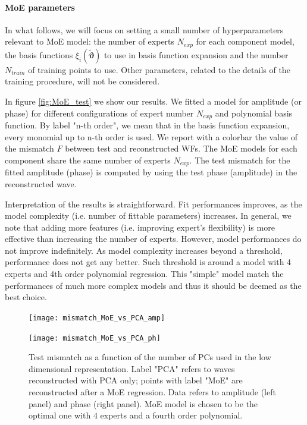 \paragraph{MoE parameters}
In what follows, we will focus on setting a small number of hyperparameters relevant to MoE model: the number of experts $N_{exp}$ for each component model, the basis functions $\xi_i(\boldsymbol{\tilde{\vartheta}})$ to use in basis function expansion and the number $N_{train}$ of training points to use.
Other parameters, related to the details of the training procedure, will not be considered.
\par
In figure \ref{fig:MoE_test} we show our results.
We fitted a model for amplitude (or phase) for different configurations of expert number $N_{exp}$ and polynomial basis function.
By label "n-th order", we mean that in the basis function expansion, every monomial up to n-th order is used.
We report with a colorbar the value of the mismatch $F$ between test and reconstructed WFs. The MoE models for each component share the same number of experts $N_{exp}$.
The test mismatch for the fitted amplitude (phase) is computed by using the test phase (amplitude) in the reconstructed wave.
\par
Interpretation of the results is straightforward. Fit performances improves, as the model complexity (i.e. number of fittable parameters) increases.
In general, we note that adding more features (i.e. improving expert's flexibility) is more effective than increasing the number of experts.
However, model performances do not improve indefinitely. As model complexity increases beyond a threshold, performance does not get any better.
Such threshold is around a model with 4 experts and 4th order polynomial regression. This "simple" model match the performances of much more complex models and thus it should be deemed as the best choice.
\begin{figure}[!t]
	\centering 
    \begin{minipage}{.5\linewidth}
		\centering
	    \texttt{[image: mismatch\_MoE\_vs\_PCA\_amp]}
	\end{minipage}\hfill
    \begin{minipage}{.5\linewidth}
		\centering
	    \texttt{[image: mismatch\_MoE\_vs\_PCA\_ph]}
	\end{minipage}
	\caption{Test mismatch as a function of the number of PCs used in the low dimensional representation.
Label "PCA" refers to waves reconstructed with PCA only; points with label "MoE" are reconstructed after a MoE regression.
Data refers to amplitude (left panel) and phase (right panel).
MoE model is chosen to be the optimal one with $4$ experts and a fourth order polynomial.
}
	\label{fig:mismatch_MoE_vs_PCA}
\end{figure}
